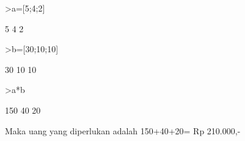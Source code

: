 \documentclass[12pt,arial,letterpaper]{book}
\begin{document}
\begin{eulernootebook}
\begin{eulercomment}
\begin{eulercomment}
\begin{eulernootebook}
\begin{eulercomment}
\begin{eulercomment}
\begin{eulercomment}
\begin{eulercomment}
\begin{eulercomment}
\begin{eulercomment}
\begin{eulercomment}
\begin{eulercomment}
\begin{eulercomment}
\begin{eulercomment}
\begin{eulercomment}
\begin{eulercomment}
\begin{eulercomment}
\begin{eulerttcomment}
\end{eulerttcomment}
\begin{eulerprompt}
>a=[5;4;2]
\end{eulerprompt}
\begin{euleroutput}
          5 
          4 
          2 
\end{euleroutput}
\begin{eulerprompt}
>b=[30;10;10]
\end{eulerprompt}
\begin{euleroutput}
         30 
         10 
         10 
\end{euleroutput}
\begin{eulerprompt}
>a*b
\end{eulerprompt}
\begin{euleroutput}
        150 
         40 
         20 
\end{euleroutput}
\begin{eulercomment}
Maka uang yang diperlukan adalah 150+40+20= Rp 210.000,-


\end{eulercomment}
\end{eulercomment}
\end{eulercomment}
\end{eulercomment}
\end{eulercomment}
\end{eulercomment}
\end{eulercomment}
\end{eulercomment}
\end{eulercomment}
\end{eulercomment}
\end{eulercomment}
\end{eulercomment}
\end{eulercomment}
\end{eulercomment}
\end{eulernootebook}
\end{eulercomment}
\end{eulercomment}
\end{eulernootebook}
\end{document}
